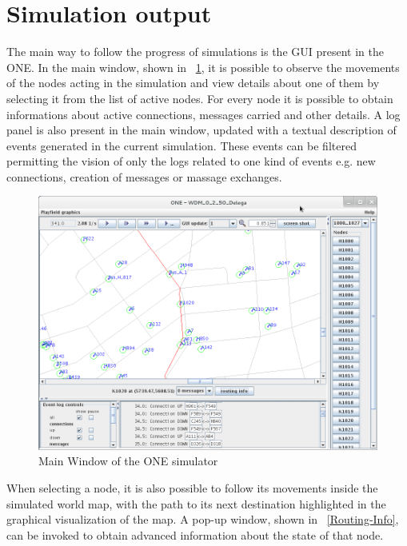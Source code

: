 \section{Simulation output}
The main way to follow the progress of simulations is the GUI present in the ONE. In the main window, shown in \figurename~\ref{Schermata-ONE}, it is possible to observe the movements of the nodes acting in the simulation and view details about one of them by selecting it from the list of active nodes. For every node it is possible to obtain informations about active connections, messages carried and other details. A log panel is also present in the main window, updated with a textual description of events generated in the current simulation. These events can be filtered permitting the vision of only the logs related to one kind of events e.g. new connections, creation of messages or massage exchanges.
\\
\begin{figure}[htpb]
  \begin{center}
    \includegraphics[scale=0.4]{5-simulatore/img/Schermata-ONE.png}
    \caption{Main Window of the ONE simulator}    
    \label{Schermata-ONE}
  \end{center}
\end{figure}

When selecting a node, it is also possible to follow its movements inside the simulated world map, with the path to its next destination highlighted in the graphical visualization of the map. A pop-up window, shown in \figurename~\ref{Routing-Info}, can be invoked to obtain advanced information about the state of that node.
\\

